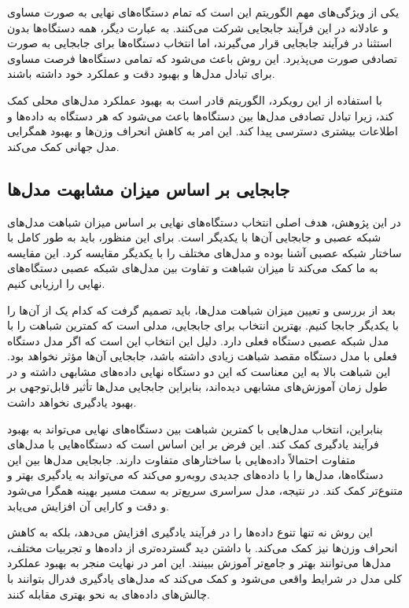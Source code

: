 یکی از ویژگی‌های مهم الگوریتم
این است که تمام دستگاه‌های نهایی به صورت مساوی و عادلانه در این فرآیند جابجایی شرکت می‌کنند. به عبارت دیگر، همه دستگاه‌ها بدون استثنا در فرآیند جابجایی قرار می‌گیرند، اما انتخاب دستگاه‌ها برای جابجایی به صورت تصادفی صورت می‌پذیرد. این روش باعث می‌شود که تمامی دستگاه‌ها فرصت مساوی برای تبادل مدل‌ها و بهبود دقت و عملکرد خود داشته باشند.

با استفاده از این رویکرد، الگوریتم
قادر است به بهبود عملکرد مدل‌های محلی کمک کند، زیرا تبادل تصادفی مدل‌ها بین دستگاه‌ها باعث می‌شود که هر دستگاه به داده‌ها و اطلاعات بیشتری دسترسی پیدا کند. این امر به کاهش انحراف وزن‌ها و بهبود همگرایی مدل جهانی کمک می‌کند.


\subsection{جابجایی بر اساس میزان مشابهت مدل‌ها}
در این پژوهش، هدف اصلی انتخاب دستگاه‌های نهایی بر اساس میزان شباهت مدل‌های شبکه عصبی و جابجایی آن‌ها با یکدیگر است. برای این منظور، باید به طور کامل با ساختار شبکه عصبی آشنا بوده و مدل‌های مختلف را با یکدیگر مقایسه کرد. این مقایسه به ما کمک می‌کند تا میزان شباهت و تفاوت بین مدل‌های شبکه عصبی دستگاه‌های نهایی را ارزیابی کنیم.

بعد از بررسی و تعیین میزان شباهت مدل‌ها، باید تصمیم گرفت که کدام یک از آن‌ها را با یکدیگر جابجا کنیم. بهترین انتخاب برای جابجایی، مدلی است که کمترین شباهت را با مدل شبکه عصبی دستگاه فعلی دارد. دلیل این انتخاب این است که اگر مدل دستگاه فعلی با مدل دستگاه مقصد شباهت زیادی داشته باشد، جابجایی آن‌ها مؤثر نخواهد بود. این شباهت بالا به این معناست که این دو دستگاه نهایی داده‌های مشابهی داشته و در طول زمان آموزش‌های مشابهی دیده‌اند، بنابراین جابجایی مدل‌ها تأثیر قابل‌توجهی بر بهبود یادگیری نخواهد داشت.

بنابراین، انتخاب مدل‌هایی با کمترین شباهت بین دستگاه‌های نهایی می‌تواند به بهبود فرآیند یادگیری کمک کند. این فرض بر این اساس است که دستگاه‌هایی با مدل‌های متفاوت احتمالاً داده‌هایی با ساختارهای متفاوت دارند. جابجایی مدل‌ها بین این دستگاه‌ها، مدل‌ها را با داده‌های جدیدی روبه‌رو می‌کند که می‌تواند به یادگیری بهتر و متنوع‌تر کمک کند. در نتیجه، مدل سراسری سریع‌تر به سمت مسیر بهینه همگرا می‌شود و دقت و کارایی آن افزایش می‌یابد.

این روش نه تنها تنوع داده‌ها را در فرآیند یادگیری افزایش می‌دهد، بلکه به کاهش انحراف وزن‌ها نیز کمک می‌کند. با داشتن دید گسترده‌تری از داده‌ها و تجربیات مختلف، مدل‌ها می‌توانند بهتر و جامع‌تر آموزش ببینند. این امر در نهایت منجر به بهبود عملکرد کلی مدل در شرایط واقعی می‌شود و کمک می‌کند که مدل‌های یادگیری فدرال بتوانند با چالش‌های داده‌های
به نحو بهتری مقابله کنند.


